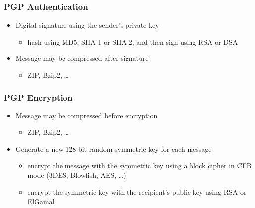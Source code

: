 \documentclass[final]{article}
\begin{document}
\subsubsection*{PGP Authentication}
\begin{itemize}[nosep]
    \item Digital signature using the sender's private key
          \begin{itemize}[nosep]
              \item hash using MD5, SHA-1 or SHA-2, and then sign using RSA or DSA
          \end{itemize}
    \item Message may be compressed after signature
          \begin{itemize}[nosep]
              \item ZIP, Bzip2, \dots
          \end{itemize}
\end{itemize}
\subsubsection*{PGP Encryption}
\begin{itemize}
    \item Message may be compressed before encryption
          \begin{itemize}[nosep]
              \item ZIP, Bzip2, \dots
          \end{itemize}
    \item Generate a new 128-bit random symmetric key for each message
          \begin{itemize}[nosep]
              \item encrypt the message with the symmetric key using a block cipher in CFB mode (3DES, Blowfish, AES, \dots)
              \item encrypt the symmetric key with the recipient's public key using RSA or ElGamal
          \end{itemize}
\end{itemize}
\end{document}
